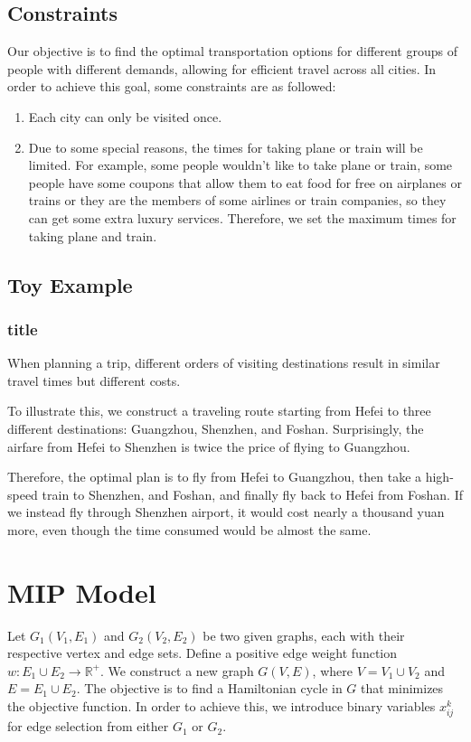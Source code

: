 \documentclass[11pt]{extarticle}
\begin{document}
\subsection{Constraints}

Our objective is to find the optimal transportation options for different
groups of people with different demands, allowing for efficient travel across
all cities. In order to achieve this goal, some constraints are as followed:

\begin{enumerate}
  \item Each city can only be visited once.
  \item Due to some special reasons, the times for taking plane or train will be
        limited. For example, some people wouldn't like to take plane or train, some
        people have some coupons that allow them to eat food for free on airplanes or
        trains or they are the members of some airlines or train companies, so they can
        get some extra luxury services. Therefore, we set the maximum times for taking
        plane and train.
\end{enumerate}

\subsection{Toy Example}

\subsubsection{title}
When planning a trip, different orders of visiting destinations result in
similar travel times but different costs.

To illustrate this, we construct a traveling route starting from Hefei to three
different destinations: Guangzhou, Shenzhen, and Foshan. Surprisingly, the
airfare from Hefei to Shenzhen is twice the price of flying to Guangzhou.

Therefore, the optimal plan is to fly from Hefei to Guangzhou, then take a
high-speed train to Shenzhen, and Foshan, and finally fly back to Hefei from
Foshan. If we instead fly through Shenzhen airport, it would cost nearly a
thousand yuan more, even though the time consumed would be almost the same.

\section{MIP Model}
Let $G_1(V_1, E_1)$ and $G_2(V_2, E_2)$ be two given graphs, each with their
respective vertex and edge sets. Define a positive edge weight function $w :
  E_1 \cup E_2 \rightarrow \mathbb{R}^+$. We construct a new graph $G(V, E)$,
where $V = V_1 \cup V_2$ and $E = E_1 \cup E_2$. The objective is to find a
Hamiltonian cycle in $G$ that minimizes the objective function. In order to
achieve this, we introduce binary variables $x_{ij}^k$ for edge selection from
either $G_1$ or $G_2$.
\end{document}
